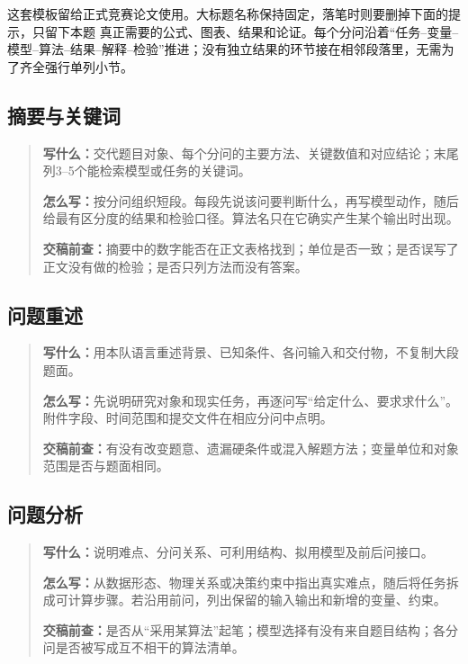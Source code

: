 \documentclass[UTF8,zihao=-4]{ctexart}
\begin{document}
这套模板留给正式竞赛论文使用。大标题名称保持固定，落笔时则要删掉下面的提示，只留下本题
真正需要的公式、图表、结果和论证。每个分问沿着“任务--变量--模型--算法--结果--解释--检验”推进；没有独立结果的环节接在相邻段落里，无需为了齐全强行单列小节。

\subsection{摘要与关键词}
\begin{quote}\small
\noindent\textbf{\color{inkblue}写什么：}交代题目对象、每个分问的主要方法、关键数值和对应结论；末尾列3--5个能检索模型或任务的关键词。\par
\noindent\textbf{\color{inkblue}怎么写：}按分问组织短段。每段先说该问要判断什么，再写模型动作，随后给最有区分度的结果和检验口径。算法名只在它确实产生某个输出时出现。\par
\noindent\textbf{\color{inkblue}交稿前查：}摘要中的数字能否在正文表格找到；单位是否一致；是否误写了正文没有做的检验；是否只列方法而没有答案。
\end{quote}

\subsection{问题重述}
\begin{quote}\small
\noindent\textbf{\color{inkblue}写什么：}用本队语言重述背景、已知条件、各问输入和交付物，不复制大段题面。\par
\noindent\textbf{\color{inkblue}怎么写：}先说明研究对象和现实任务，再逐问写“给定什么、要求求什么”。附件字段、时间范围和提交文件在相应分问中点明。\par
\noindent\textbf{\color{inkblue}交稿前查：}有没有改变题意、遗漏硬条件或混入解题方法；变量单位和对象范围是否与题面相同。
\end{quote}

\subsection{问题分析}
\begin{quote}\small
\noindent\textbf{\color{inkblue}写什么：}说明难点、分问关系、可利用结构、拟用模型及前后问接口。\par
\noindent\textbf{\color{inkblue}怎么写：}从数据形态、物理关系或决策约束中指出真实难点，随后将任务拆成可计算步骤。若沿用前问，列出保留的输入输出和新增的变量、约束。\par
\noindent\textbf{\color{inkblue}交稿前查：}是否从“采用某算法”起笔；模型选择有没有来自题目结构；各分问是否被写成互不相干的算法清单。
\end{quote}
\end{document}
